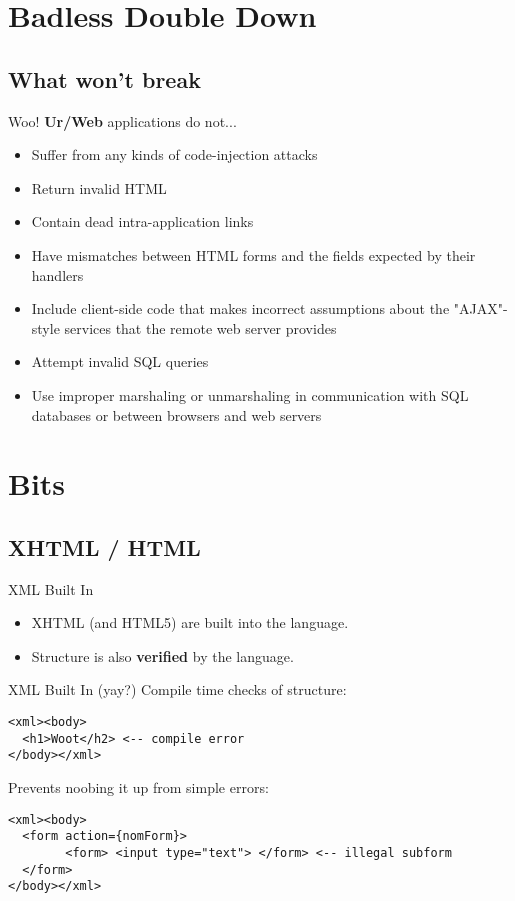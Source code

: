 \documentclass{beamer}
\begin{document}
\section{Badless Double Down}
\subsection{What won't break}
\begin{frame}{Woo!}
\textbf{Ur/Web} applications do not...

\begin{itemize}
\item Suffer from any kinds of code-injection attacks
\item Return invalid HTML
\item Contain dead intra-application links
\item Have mismatches between HTML forms and the fields expected by their handlers
\item Include client-side code that makes incorrect assumptions about the "AJAX"-style services that the remote web server provides
\item Attempt invalid SQL queries
\item Use improper marshaling or unmarshaling in communication with SQL databases or between browsers and web servers
\end{itemize}
\end{frame}

\section{Bits}
\subsection{XHTML / HTML}
\begin{frame}{XML Built In}

\begin{itemize}
\item XHTML (and HTML5) are built into the language.\\
\item Structure is also \textbf{verified} by the language.
\end{itemize}
\end{frame}

\begin{frame}[fragile]{XML Built In (yay?)}
Compile time checks of structure:
\begin{verbatim}
<xml><body>
  <h1>Woot</h2> <-- compile error
</body></xml>
\end{verbatim}
Prevents noobing it up from simple errors:
\begin{verbatim}
<xml><body>
  <form action={nomForm}>
		<form> <input type="text"> </form> <-- illegal subform
  </form>
</body></xml>
\end{verbatim}
\end{frame}
\end{document}
